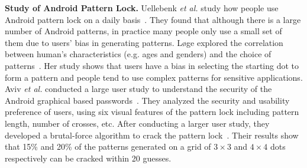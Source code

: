 
\noindent \textbf{Study of Android Pattern Lock.}
Uellebenk \emph{et al.} study how people use Android pattern lock on
a daily basis~\cite{uellenbeck2013quantifying}.  They found that although there
is a large number of Android patterns, in
practice many people only use a small set of them due to users' bias in
generating patterns. L{\o}ge explored the correlation between
human's characteristics (e.g. ages and genders) and the choice of
patterns~\cite{alpnorway}. Her study shows that users have a bias in selecting the
starting dot to form a pattern and people tend to use complex patterns
for sensitive applications.
Aviv \emph{et al.} conducted a large user study to understand the security of the Android graphical based passwords~\cite{Aviv2014Understanding}. They analyzed the security and usability preference of users, using six visual features of the pattern lock including pattern length, number of crosses, etc.
After conducting a larger user study, they developed a brutal-force  algorithm to
crack the pattern lock~\cite{Aviv2015Is}. Their results show that 15\% and 20\% of the  patterns
generated on a grid of $3\times3$ and $4\times4$ dots respectively can be cracked within 20 guesses.

